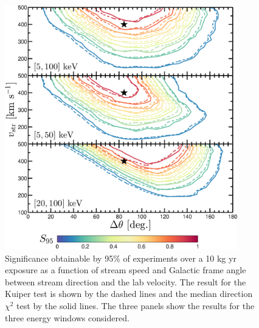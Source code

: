 \begin{figure}
	\centering
	\includegraphics[trim = 0mm 0mm 0mm 0mm, clip, width=0.9\textwidth]{Figures/testcomparison_DeltaTheta_cont.eps}
	\caption[Non-parametric tests as a function of stream velocity]{Significance obtainable by 95\% of experiments over a 10 kg yr exposure as a function of stream speed and Galactic frame angle between stream direction and the lab velocity. The result for the Kuiper test is shown by the dashed lines and the median direction $\chi^2$ test by the solid lines. The three panels show the results for the three energy windows considered.}
	\label{fig:testcomparison_DeltaTheta}
\end{figure}
